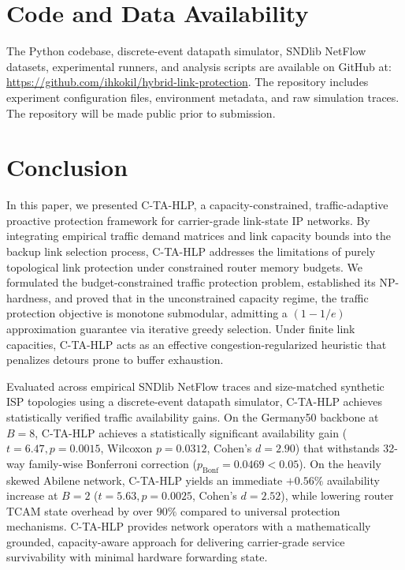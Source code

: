 \documentclass[journal]{IEEEtran}
\begin{document}
\section{Code and Data Availability}
The Python codebase, discrete-event datapath simulator, SNDlib NetFlow datasets, experimental runners, and analysis scripts are available on GitHub at: \url{https://github.com/ihkokil/hybrid-link-protection}. The repository includes experiment configuration files, environment metadata, and raw simulation traces. The repository will be made public prior to submission.

\section{Conclusion}
In this paper, we presented C-TA-HLP, a capacity-constrained, traffic-adaptive proactive protection framework for carrier-grade link-state IP networks. By integrating empirical traffic demand matrices and link capacity bounds into the backup link selection process, C-TA-HLP addresses the limitations of purely topological link protection under constrained router memory budgets. We formulated the budget-constrained traffic protection problem, established its NP-hardness, and proved that in the unconstrained capacity regime, the traffic protection objective is monotone submodular, admitting a $(1 - 1/e)$ approximation guarantee via iterative greedy selection. Under finite link capacities, C-TA-HLP acts as an effective congestion-regularized heuristic that penalizes detours prone to buffer exhaustion.

Evaluated across empirical SNDlib NetFlow traces and size-matched synthetic ISP topologies using a discrete-event datapath simulator, C-TA-HLP achieves statistically verified traffic availability gains. On the Germany50 backbone at $B=8$, C-TA-HLP achieves a statistically significant availability gain ($t = 6.47, p = 0.0015$, Wilcoxon $p = 0.0312$, Cohen's $d = 2.90$) that withstands 32-way family-wise Bonferroni correction ($p_{\text{Bonf}} = 0.0469 < 0.05$). On the heavily skewed Abilene network, C-TA-HLP yields an immediate $+0.56\%$ availability increase at $B=2$ ($t = 5.63, p = 0.0025$, Cohen's $d = 2.52$), while lowering router TCAM state overhead by over $90\%$ compared to universal protection mechanisms. C-TA-HLP provides network operators with a mathematically grounded, capacity-aware approach for delivering carrier-grade service survivability with minimal hardware forwarding state.



\end{document}
